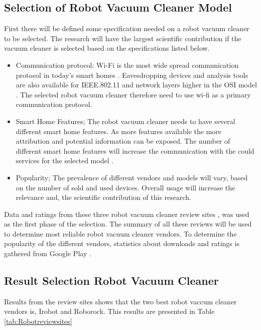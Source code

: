 \subsection{Selection of Robot Vacuum Cleaner Model}
First there will be defined some specification needed on a robot vacuum cleaner to be selected. The research will have the largest scientific contribution if the vacuum cleaner is selected based on the specifications listed below.
\begin{itemize}
    \item Communication protocol: Wi-Fi is the most wide spread communication protocol in today's smart homes \cite{robotsel1}. Eavesdropping devices and analysis tools are also available for IEEE.802.11 and network layers higher in the OSI model \cite{osimodel}. The selected robot vacuum cleaner therefore need to use wi-fi as a primary communication protocol.
    
    \item Smart Home Features; The robot vacuum cleaner needs to have several different smart home features. As more features available the more attribution and potential information can be exposed. The number of different smart home features will increase the communication with the could services for the selected model \cite{robotsel4}.
    
    \item Popularity; The prevalence of different vendors and models will vary, based on the number of sold and used devices. Overall usage will increase the relevance and, the scientific contribution of this research.  
\end{itemize}

Data and ratings from these three robot vacuum cleaner review sites \cite{robotsel11}\cite{robotsel12}\cite{robotsel13}, was used  as the first phase of the selection. The summary of all these reviews will be used to determine most reliable robot vacuum cleaner vendors. To determine the popularity of the different vendors, statistics about downloads and ratings is gathered from Google Play \cite{GooglePlay}.

\subsection{Result Selection Robot Vacuum Cleaner}

Results from the review sites shows that the two best robot vaccum cleaner vendors is, Irobot and Roborock. This results are presented in  Table \ref{tab:Robotreviewsites}

